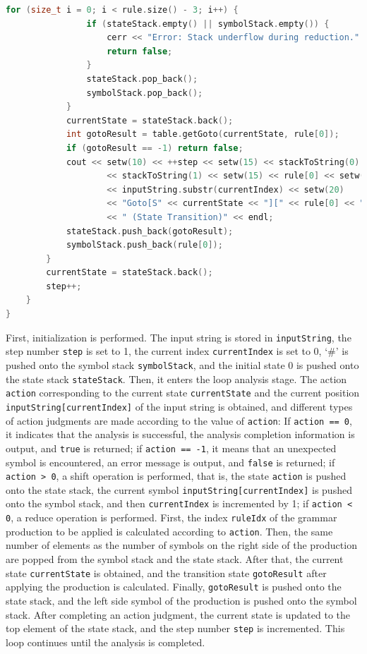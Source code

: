 \documentclass[a4paper,12pt]{article}
\begin{document}
\begin{lstlisting}[language=c++]
            for (size_t i = 0; i < rule.size() - 3; i++) {
                if (stateStack.empty() || symbolStack.empty()) {
                    cerr << "Error: Stack underflow during reduction." << endl;
                    return false;
                }
                stateStack.pop_back();
                symbolStack.pop_back();
            }
            currentState = stateStack.back();
            int gotoResult = table.getGoto(currentState, rule[0]);
            if (gotoResult == -1) return false;
            cout << setw(10) << ++step << setw(15) << stackToString(0) << setw(10)
                    << stackToString(1) << setw(15) << rule[0] << setw(15)
                    << inputString.substr(currentIndex) << setw(20)
                    << "Goto[S" << currentState << "][" << rule[0] << "]=" << gotoResult
                    << " (State Transition)" << endl;
            stateStack.push_back(gotoResult);
            symbolStack.push_back(rule[0]);
        }
        currentState = stateStack.back();
        step++;
    }
}
    \end{lstlisting}
First, initialization is performed. The input string is stored in \texttt{inputString}, the step number \texttt{step} is set to 1, the current index \texttt{currentIndex} is set to 0, `\#' is pushed onto the symbol stack \texttt{symbolStack}, and the initial state 0 is pushed onto the state stack \texttt{stateStack}. Then, it enters the loop analysis stage. The action \texttt{action} corresponding to the current state \texttt{currentState} and the current position \texttt{inputString[currentIndex]} of the input string is obtained, and different types of action judgments are made according to the value of \texttt{action}: If \texttt{action == 0}, it indicates that the analysis is successful, the analysis completion information is output, and \texttt{true} is returned; if \texttt{action == -1}, it means that an unexpected symbol is encountered, an error message is output, and \texttt{false} is returned; if \texttt{action > 0}, a shift operation is performed, that is, the state \texttt{action} is pushed onto the state stack, the current symbol \texttt{inputString[currentIndex]} is pushed onto the symbol stack, and then \texttt{currentIndex} is incremented by 1; if \texttt{action < 0}, a reduce operation is performed. First, the index \texttt{ruleIdx} of the grammar production to be applied is calculated according to \texttt{action}. Then, the same number of elements as the number of symbols on the right side of the production are popped from the symbol stack and the state stack. After that, the current state \texttt{currentState} is obtained, and the transition state \texttt{gotoResult} after applying the production is calculated. Finally, \texttt{gotoResult} is pushed onto the state stack, and the left side symbol of the production is pushed onto the symbol stack. After completing an action judgment, the current state is updated to the top element of the state stack, and the step number \texttt{step} is incremented. This loop continues until the analysis is completed.
\end{document}
